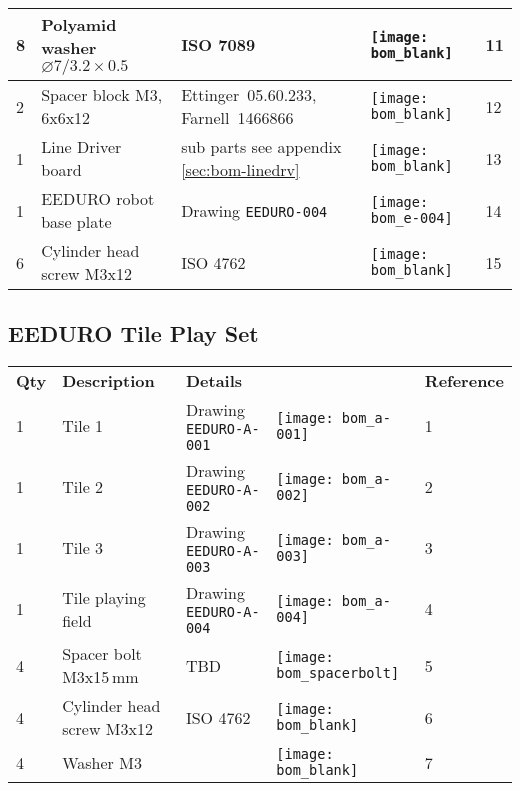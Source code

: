 \begin{tabular}{m{0.5cm} m{5cm} m{5cm} m{1cm} m{1.5cm}}
\hline
8    & Polyamid washer $\varnothing 7/3.2\times0.5$ & ISO 7089                                          & \texttt{[image: bom\_blank]}   & 11   \\
\hline
2    & Spacer block M3, 6x6x12                      & \mbox{Ettinger 05.60.233,} \mbox{Farnell 1466866} & \texttt{[image: bom\_blank]}   & 12   \\
\hline
1    & Line Driver board                            & sub parts see appendix \ref{sec:bom-linedrv}      & \texttt{[image: bom\_blank]}   & 13   \\
\hline
1    & EEDURO robot base plate                      & Drawing \texttt{EEDURO-004}                       & \texttt{[image: bom\_e-004]}   & 14   \\
\hline
6    & Cylinder head screw M3x12                    & ISO 4762                                          & \texttt{[image: bom\_blank]}   & 15   \\
\hline
\end{tabular}

\subsection{EEDURO Tile Play Set}
\label{sec:bom-tileset}

\begin{tabular}{m{0.5cm} m{5cm} m{5cm} m{1cm} m{1.5cm}}
\bfseries Qty  & \bfseries Description              & \bfseries Details             &                                                   & \bfseries Reference \\
1    & Tile 1                                       & Drawing \texttt{EEDURO-A-001} & \texttt{[image: bom\_a-001]}           & 1 \\
\hline
1    & Tile 2                                       & Drawing \texttt{EEDURO-A-002} & \texttt{[image: bom\_a-002]}           & 2 \\
\hline
1    & Tile 3                                       & Drawing \texttt{EEDURO-A-003} & \texttt{[image: bom\_a-003]}           & 3 \\
\hline
1    & Tile playing field                           & Drawing \texttt{EEDURO-A-004} & \texttt{[image: bom\_a-004]}           & 4 \\
\hline
4    & Spacer bolt M3x15\,mm                        & TBD                           & \texttt{[image: bom\_spacerbolt]}      & 5\\
\hline
4    & Cylinder head screw M3x12                    & ISO 4762                      & \texttt{[image: bom\_blank]}           & 6 \\
\hline
4    & Washer M3                                    &                               & \texttt{[image: bom\_blank]}           & 7 \\
\hline
\end{tabular}

